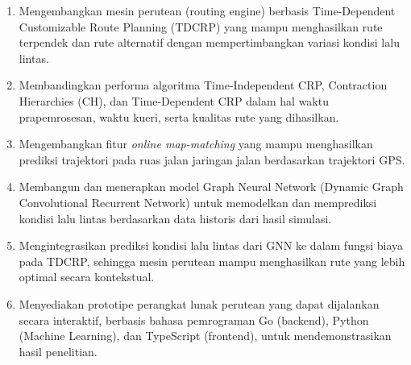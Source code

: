 \begin{enumerate}
    \item Mengembangkan mesin perutean (routing engine) berbasis Time-Dependent Customizable Route Planning (TDCRP) yang mampu menghasilkan rute terpendek dan rute alternatif dengan mempertimbangkan variasi kondisi lalu lintas.
    \item Membandingkan performa algoritma Time-Independent CRP, Contraction Hierarchies (CH), dan Time-Dependent CRP dalam hal waktu prapemrosesan, waktu kueri, serta kualitas rute yang dihasilkan.
    \item Mengembangkan fitur \textit{online map-matching} yang mampu menghasilkan      prediksi trajektori pada ruas jalan jaringan jalan berdasarkan trajektori GPS.
    \item  Membangun dan menerapkan model Graph Neural Network (Dynamic Graph Convolutional Recurrent Network) untuk memodelkan dan memprediksi kondisi lalu lintas berdasarkan data historis dari hasil simulasi.
    \item Mengintegrasikan prediksi kondisi lalu lintas dari GNN ke dalam fungsi biaya pada TDCRP, sehingga mesin perutean mampu menghasilkan rute yang lebih optimal secara kontekstual.   
    \item Menyediakan prototipe perangkat lunak perutean yang dapat dijalankan secara interaktif, berbasis bahasa pemrograman Go (backend), Python (Machine Learning), dan TypeScript (frontend), untuk mendemonstrasikan hasil penelitian.
\end{enumerate}
